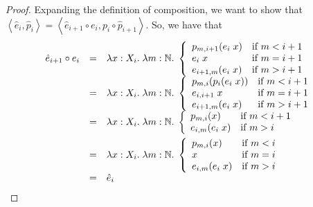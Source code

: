 \begin{proof}
Expanding the definition of composition, we want to show that 
$\left<\hat{e}_i, \hat{p}_i\right> = \left<\hat{e}_{i+1} \circ e_i,
                                          p_i \circ \hat{p}_{i+1} \right>$.
So, we have that
\begin{displaymath}
  \begin{array}{lcl}
    \hat{e}_{i+1} \circ e_i
      & = &     
      \lambda x:X_i.\; \lambda m:\mathbb{N}.\; 
       \left\{ 
          \begin{array}{ll}
            p_{m,{i+1}}(e_i\;x) & \mbox{if } m < i+1 \\
            e_i\;x         & \mbox{if } m = i+1 \\
            e_{{i+1},m}(e_i\;x) & \mbox{if } m > i+1 \\
          \end{array}
       \right. 
   \\[1em]
      & = &     
      \lambda x:X_i.\; \lambda m:\mathbb{N}.\; 
       \left\{ 
          \begin{array}{ll}
            p_{m,i}(p_i(e_i\;x)) & \mbox{if } m < i+1 \\
            e_{i, i+1}\;x         & \mbox{if } m = i+1 \\
            e_{{i+1},m}(e_i\;x) & \mbox{if } m > i+1 \\
          \end{array}
       \right. 
   \\[1em]
     & = & 
      \lambda x:X_i.\; \lambda m:\mathbb{N}.\; 
       \left\{ 
          \begin{array}{ll}
            p_{m,i}(x) & \mbox{if } m < i+1 \\
            e_{i,m}(e_i\;x) & \mbox{if } m > i \\
          \end{array}
       \right. 
   \\[1em]
     & = & 
      \lambda x:X_i.\; \lambda m:\mathbb{N}.\; 
       \left\{ 
          \begin{array}{ll}
            p_{m,i}(x) & \mbox{if } m < i \\
            x             & \mbox{if } m = i \\
            e_{i,m}(e_i\;x) & \mbox{if } m > i \\
          \end{array}
       \right. 
   \\[1em]
     & = & \hat{e}_i \\
  \end{array}
\end{displaymath}


\end{proof}
